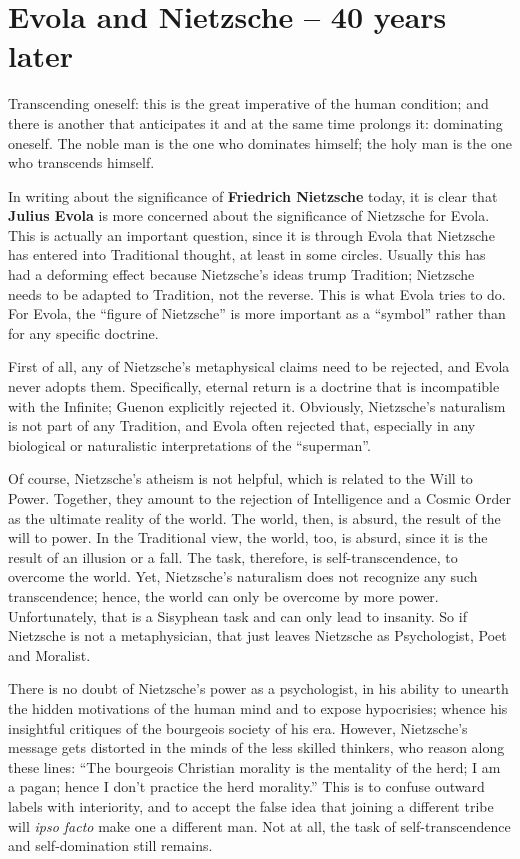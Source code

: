 \section{Evola and Nietzsche – 40 years later}

\begin{quotex}
Transcending oneself: this is the great imperative of the human condition; and there is another that anticipates it and at the same time prolongs it: dominating oneself. The noble man is the one who dominates himself; the holy man is the one who transcends himself.
\end{quotex}


In writing about the significance of \textbf{Friedrich Nietzsche} today, it is clear that \textbf{Julius Evola} is more concerned about the significance of Nietzsche for Evola. This is actually an important question, since it is through Evola that Nietzsche has entered into Traditional thought, at least in some circles. Usually this has had a deforming effect because Nietzsche's ideas trump Tradition; Nietzsche needs to be adapted to Tradition, not the reverse. This is what Evola tries to do. For Evola, the ``figure of Nietzsche'' is more important as a ``symbol'' rather than for any specific doctrine.

First of all, any of Nietzsche's metaphysical claims need to be rejected, and Evola never adopts them. Specifically, eternal return is a doctrine that is incompatible with the Infinite; Guenon explicitly rejected it. Obviously, Nietzsche's naturalism is not part of any Tradition, and Evola often rejected that, especially in any biological or naturalistic interpretations of the ``superman''.

Of course, Nietzsche's atheism is not helpful, which is related to the Will to Power. Together, they amount to the rejection of Intelligence and a Cosmic Order as the ultimate reality of the world. The world, then, is absurd, the result of the will to power. In the Traditional view, the world, too, is absurd, since it is the result of an illusion or a fall. The task, therefore, is self-transcendence, to overcome the world. Yet, Nietzsche's naturalism does not recognize any such transcendence; hence, the world can only be overcome by more power. Unfortunately, that is a Sisyphean task and can only lead to insanity. So if Nietzsche is not a metaphysician, that just leaves Nietzsche as Psychologist, Poet and Moralist.

There is no doubt of Nietzsche's power as a psychologist, in his ability to unearth the hidden motivations of the human mind and to expose hypocrisies; whence his insightful critiques of the bourgeois society of his era. However, Nietzsche's message gets distorted in the minds of the less skilled thinkers, who reason along these lines: ``The bourgeois Christian morality is the mentality of the herd; I am a pagan; hence I don't practice the herd morality.'' This is to confuse outward labels with interiority, and to accept the false idea that joining a different tribe will \emph{ipso facto} make one a different man. Not at all, the task of self-transcendence and self-domination still remains.

